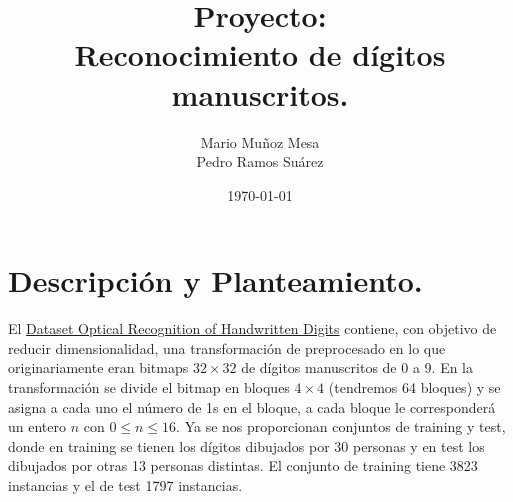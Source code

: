 \documentclass[11pt,a4paper]{article}
\title{
\huge \bf Proyecto:\\ Reconocimiento de dígitos manuscritos.\\
	}
\author{Mario Muñoz Mesa\\Pedro Ramos Suárez}
\date{\today}
\theoremstyle{definition}
\begin{document}
	\maketitle
	\renewcommand*\contentsname{Índice}	
	\tableofcontents
	
	\newpage
	
	\section{Descripción y Planteamiento.}
	
	El \href{https://archive.ics.uci.edu/ml/datasets/optical+recognition+of+handwritten+digits}{Dataset Optical Recognition of Handwritten Digits} contiene, con objetivo de reducir dimensionalidad, una transformación de preprocesado en lo que originariamente eran bitmaps $32 \times 32$ de dígitos manuscritos de 0 a 9. En la transformación se divide el bitmap en bloques $4\times 4$ (tendremos 64 bloques) y se asigna a cada uno el número de 1s en el bloque, a cada bloque le corresponderá un entero $n$ con $0\leq n\leq 16$. Ya se nos proporcionan conjuntos de training y test, donde en training se tienen los dígitos dibujados por 30 personas y en test los dibujados por otras 13 personas distintas. El conjunto de training tiene 3823 instancias y el de test 1797 instancias.
	
\end{document}
